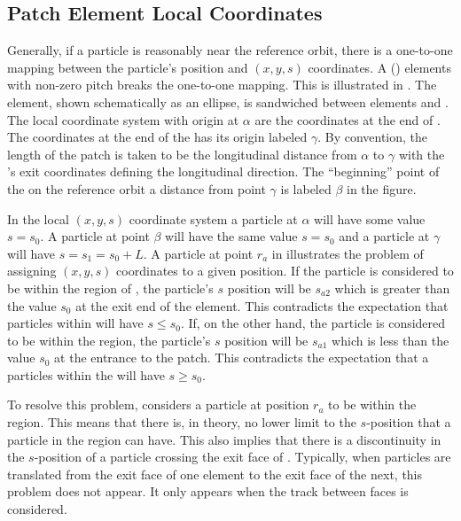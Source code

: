 \subsection{Patch Element Local Coordinates}
\label{s:patch.prob}

Generally, if a particle is reasonably near the reference orbit, there
is a one-to-one mapping between the particle's position and $(x, y,
s)$ coordinates. A  () elements with non-zero
pitch breaks the one-to-one mapping. This is illustrated in
.  The  element, shown schematically as an
ellipse, is sandwiched between elements  and . The
local coordinate system with origin at $\alpha$ are the coordinates at
the end of . The coordinates at the end of the 
has its origin labeled $\gamma$. By convention, the length of the
patch  is taken to be the longitudinal distance from $\alpha$ to
$\gamma$ with the 's exit coordinates defining the
longitudinal direction. The ``beginning'' point of the  on the
reference orbit a distance  from point $\gamma$ is labeled
$\beta$ in the figure.

In the local $(x, y, s)$ coordinate system a particle at $\alpha$ will
have some value $s = s_0$. A particle at point $\beta$ will have the
same value $s = s_0$ and a particle at $\gamma$ will have $s = s_1 =
s_0 + L$. A particle at point $r_a$ in  illustrates
the problem of assigning $(x, y, s)$ coordinates to a given
position. If the particle is considered to be within the region of
, the particle's $s$ position will be $s_{a2}$ which is
greater than the value $s_0$ at the exit end of the element. This
contradicts the expectation that particles within  will have
$s \le s_0$.  If, on the other hand, the particle is considered to be
within the  region, the particle's $s$ position will be
$s_{a1}$ which is less than the value $s_0$ at the entrance to the
patch. This contradicts the expectation that a particles within the
 will have $s \ge s_0$.

To resolve this problem, \bmad considers a particle at position $r_a$
to be within the  region. This means that there is, in
theory, no lower limit to the $s$-position that a particle in the
 region can have. This also implies that there is a
discontinuity in the $s$-position of a particle crossing the exit face
of . Typically, when particles are translated from the exit
face of one element to the exit face of the next, this 
problem does not appear. It only appears when the track between faces
is considered.

